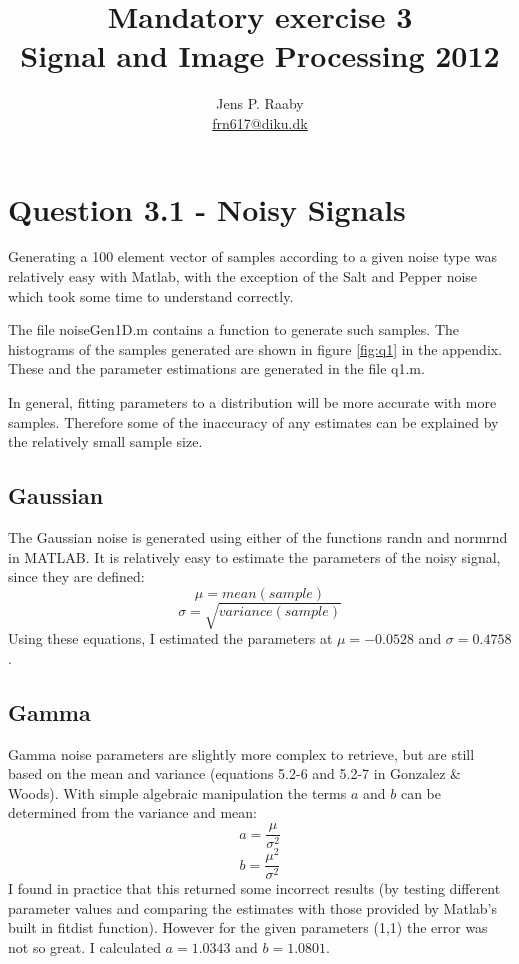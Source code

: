 \documentclass{article}
\title{Mandatory exercise 3 \\
Signal and Image Processing 2012}
\author{Jens P. Raaby \\
\url{frn617@diku.dk}}
\begin{document}
 
\maketitle

\section*{Question 3.1 - Noisy Signals}
Generating a 100 element vector of samples according to a given noise type was relatively easy with Matlab, with the exception of the Salt and Pepper noise which took some time to understand correctly. 

The file noiseGen1D.m contains a function to generate such samples. The histograms of the samples generated are shown in figure \ref{fig:q1} in the appendix. These and the parameter estimations are generated in the file q1.m.

In general, fitting parameters to a distribution will be more accurate with more samples. Therefore some of the inaccuracy of any estimates can be explained by the relatively small sample size.

\subsection*{Gaussian}
The Gaussian noise is generated using either of the functions randn and normrnd in MATLAB. It is relatively easy to estimate the parameters of the noisy signal, since they are defined:
\[
\mu = mean(sample)
\]
\[
\sigma = \sqrt{variance(sample)}
\]
Using these equations, I estimated the parameters at $\mu = -0.0528$ and $\sigma = 0.4758$.

\subsection*{Gamma}
Gamma noise parameters are slightly more complex to retrieve, but are still based on the mean and variance (equations 5.2-6 and 5.2-7 in Gonzalez \& Woods). With simple algebraic manipulation the terms $a$ and $b$ can be determined from the variance and mean:
\[
a =  \frac {\mu} {\sigma ^2}
\]
\[
b =  \frac { \mu ^2} {\sigma ^2}
\]
I found in practice that this returned some incorrect results (by testing different parameter values and comparing the estimates with those provided by Matlab's built in fitdist function). However for the given parameters (1,1) the error was not so great. I calculated $a=1.0343$ and $b=1.0801$.
\end{document}
